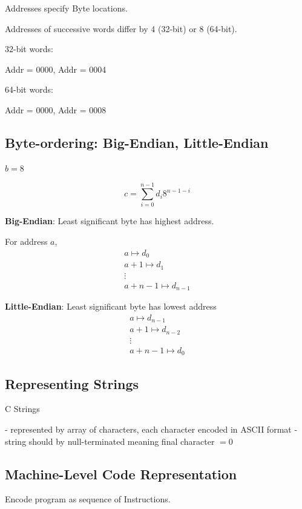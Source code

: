\documentclass[10pt]{amsart}
\begin{document}
Addresses specify Byte locations. 

Addresses of successive words differ by 4 (32-bit) or 8 (64-bit).

32-bit words:

Addr = 0000, Addr = 0004

64-bit words:

Addr = 0000, Addr = 0008

\subsection{Byte-ordering: Big-Endian, Little-Endian}

$b = 8$

\begin{equation}
c = \sum_{i=0}^{n-1} d_i 8^{n-1 -i}
\end{equation}

\textbf{Big-Endian}: Least significant byte has highest address.

For address $a$, 
\[
\begin{gathered}
a \mapsto d_0 \\
a+1 \mapsto d_1 \\
\vdots \\
a+n-1 \mapsto d_{n-1}
\end{gathered}
\]

\textbf{Little-Endian}: Least significant byte has lowest address
\[
\begin{gathered}
a \mapsto d_{n-1}  \\
a+1 \mapsto d_{n-2} \\
\vdots \\
a+n -1 \mapsto d_0
\end{gathered}
\]

\subsection{Representing Strings}

C Strings

- represented by array of characters, each character encoded in ASCII format 
- string should by null-terminated meaning final character $=0$

\subsection{Machine-Level Code Representation}

Encode program as sequence of Instructions. 
\end{document}
